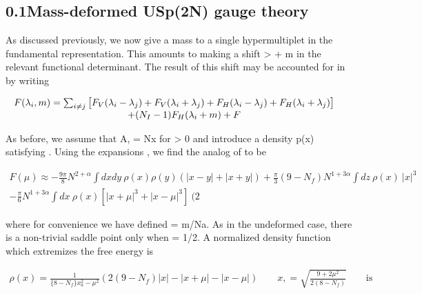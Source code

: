 \documentclass{article}
\begin{document}
\sloppy

\subsection*{0.1Mass-deformed USp(2N) gauge theory}


As discussed previously, we now give a mass to a single hypermultiplet in the fundamental
representation. This amounts to making a shift  >  + m in the relevant functional
determinant. The result of this shift may be accounted for in by writing


\begin{equation}
\begin{array} { c c } { F ( \lambda _ { i }, m ) = \sum _ { i \neq j } \big [ F _ { V } ( \lambda _ { i } - \lambda _ { j } ) + F _ { V } ( \lambda _ { i } + \lambda _ { j } ) + F _ { H } ( \lambda _ { i } - \lambda _ { j } ) + F _ { H } ( \lambda _ { i } + \lambda _ { j } ) \big ] } & { } \\ { \qquad + ( N _ { I } - 1 ) F _ { H } ( \lambda _ { i } + m ) + F _ {}}\end{array}
\end{equation}


As before, we assume that A, = Nx for  > 0 and introduce a density p(x) satisfying .
Using the expansions , we find the analog of to be


\begin{equation}
\begin{array} { r } { F ( \mu ) \approx - \frac { 9 \pi } { 8 } N ^ { 2 + \alpha } \int d x d y ~ \rho ( x ) \rho ( y ) \left ( | x - y | + | x + y | \right ) + \frac { \pi } { 3 } ( 9 - N _ { f } ) N ^ { 1 + 3 \alpha } \int d z ~ \rho ( x ) ~ | x | ^ { 3 } } \\ { - \frac { \pi } { 6 } N ^ { 1 + 3 \alpha } \int d x ~ \rho ( x ) \left [ | x + \mu | ^ { 3 } + | x - \mu | ^ { 3 } \right ] ~ ( 2}\end{array}
\end{equation}


where for convenience we have defined  = m/Na. As in the undeformed case, there is a
non-trivial saddle point only when  = 1/2. A normalized density function which extremizes
the free energy is


\begin{equation}
\begin{array} { r } { \rho ( x ) = \frac { 1 } { \{ 8 - N _ { f } \} x _ { a } ^ { 2 } - \mu ^ { 2 } } \left ( 2 ( 9 - N _ { f } ) | x | - | x + \mu | - | x - \mu | \right ) \qquad x, = \sqrt { \frac { 9 + 2 \mu ^ { 2 } } { 2 ( 8 - N _ { f } ) } } \qquad \mathrm { i s}}\end{array}
\end{equation}
\end{document}
